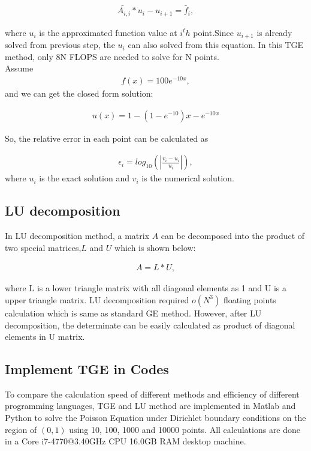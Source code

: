 \documentclass{article}
\begin{document}
\begin{align}
\tilde{{A_{i,i}}}*u_i-u_{i+1} = \tilde{f_i},
\end{align}

where $u_i$ is the approximated function value at $i^th$ point.Since $u_{i+1}$ is already solved from previous step, the $u_i$ can also solved from this equation. In this TGE method, only 8N FLOPS are needed to solve for N points.\\
Assume
\begin{align}
f(x) = 100e^{-10x},
\end{align}
and we can get the closed form solution:

\begin{align}
u(x) = 1-(1-e^{-10})x-e^{-10x}
\end{align}

So, the relative error in each point can be calculated as 

\begin{align}
   \epsilon_i=log_{10}\left(\left|\frac{v_i-u_i}
   {u_i}\right|\right),
\end{align}
where $u_i$ is the exact solution and $v_i$ is the numerical solution.

\subsection{LU decomposition}
In LU decomposition method, a matrix $A$ can be decomposed into the product of two special matrices,$L$ and $U$ which is shown below:

\begin{align}
A = L*U,
\end{align}

where L is a lower triangle matrix with all diagonal elements as 1 and U is a upper triangle matrix. LU decomposition required $o(N^3)$ floating points calculation which is same as standard GE method. However, after LU decomposition, the determinate can be easily calculated as product of diagonal elements in U matrix.

\subsection{Implement TGE in Codes}

To compare the calculation speed of different methods and efficiency of different programming languages, TGE and LU method are implemented in Matlab and Python to solve the Poisson Equation under Dirichlet boundary conditions on the region of $(0, 1)$ using 10, 100, 1000 and 10000 points. All calculations are done in a Core i7-4770@3.40GHz CPU 16.0GB RAM desktop machine.
\end{document}

